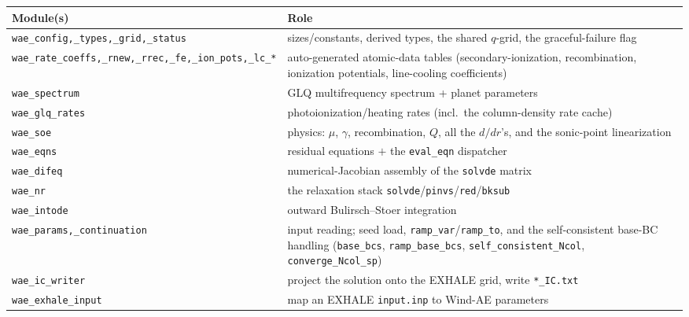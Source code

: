 \documentclass[english,a4paper]{my_memo}
\newcommand{\code}[1]{\texttt{#1}}
\begin{document}
\begin{center}\small
\begin{tabular}{@{}lp{8.4cm}@{}}
\toprule
Module(s) & Role \\
\midrule
\code{wae\_config,\_types,\_grid,\_status} & sizes/constants, derived
  types, the shared $q$-grid, the graceful-failure flag \\
\code{wae\_rate\_coeffs,\_rnew,\_rrec,\_fe,\_ion\_pots,\_lc\_*} &
  auto-generated atomic-data tables (secondary-ionization, recombination,
  ionization potentials, line-cooling coefficients) \\
\code{wae\_spectrum} & GLQ multifrequency spectrum + planet parameters \\
\code{wae\_glq\_rates} & photoionization/heating rates (incl.\ the
  column-density rate cache) \\
\code{wae\_soe} & physics: $\mu$, $\gamma$, recombination, $Q$, all the
  $d/dr$'s, and the sonic-point linearization \\
\code{wae\_eqns} & residual equations $+$ the \code{eval\_eqn} dispatcher \\
\code{wae\_difeq} & numerical-Jacobian assembly of the \code{solvde} matrix \\
\code{wae\_nr} & the relaxation stack \code{solvde}/\code{pinvs}/\code{red}/\code{bksub} \\
\code{wae\_intode} & outward Bulirsch--Stoer integration \\
\code{wae\_params,\_continuation} & input reading; seed load,
  \code{ramp\_var}/\code{ramp\_to}, and the self-consistent base-BC handling
  (\code{base\_bcs}, \code{ramp\_base\_bcs}, \code{self\_consistent\_Ncol},
  \code{converge\_Ncol\_sp}) \\
\code{wae\_ic\_writer} & project the solution onto the EXHALE grid, write \code{*\_IC.txt} \\
\code{wae\_exhale\_input} & map an EXHALE \code{input.inp} to Wind-AE parameters \\
\bottomrule
\end{tabular}
\end{center}
\end{document}
